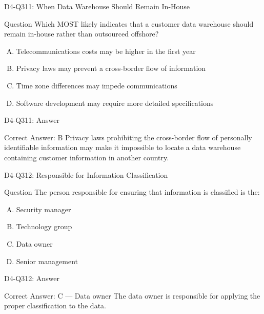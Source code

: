 \documentclass{beamer}
\begin{document}
	\begin{frame}{D4-Q311: When Data Warehouse Should Remain In-House}
		\begin{block}{Question}
			Which MOST likely indicates that a customer data warehouse should remain in-house rather than outsourced offshore?
		\end{block}
		\begin{enumerate}[(A)]
			\item Telecommunications costs may be higher in the first year
			\item Privacy laws may prevent a cross-border flow of information
			\item Time zone differences may impede communications
			\item Software development may require more detailed specifications
		\end{enumerate}
	\end{frame}
	\begin{frame}{D4-Q311: Answer}
		\begin{block}{Correct Answer: B}
			Privacy laws prohibiting the cross-border flow of personally identifiable information may make it impossible to locate a data warehouse containing customer information in another country.
		\end{block}
	\end{frame}
	
	\begin{frame}{D4-Q312: Responsible for Information Classification}
		\begin{block}{Question}
			The person responsible for ensuring that information is classified is the:
		\end{block}
		\begin{enumerate}[(A)]
			\item Security manager
			\item Technology group
			\item Data owner
			\item Senior management
		\end{enumerate}
	\end{frame}
	\begin{frame}{D4-Q312: Answer}
		\begin{block}{Correct Answer: C --- Data owner}
			The data owner is responsible for applying the proper classification to the data.
		\end{block}
	\end{frame}
	
\end{document}
